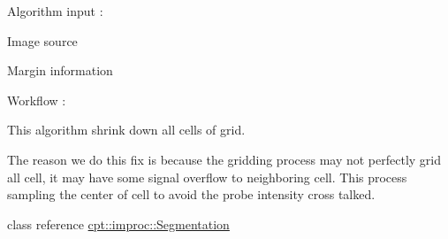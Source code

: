 Algorithm input \-:


\begin{DoxyItemize}
\item Image source
\item Margin information
\end{DoxyItemize}

Workflow \-:

This algorithm shrink down all cells of grid.

The reason we do this fix is because the gridding process may not perfectly grid all cell, it may have some signal overflow to neighboring cell. This process sampling the center of cell to avoid the probe intensity cross talked.

class reference \hyperlink{structcpt_1_1improc_1_1_segmentation}{cpt\-::improc\-::\-Segmentation} 